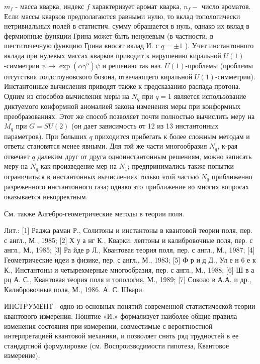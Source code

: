 \documentclass[10pt]{article}
\begin{document}
$m_{f}$ - масса кварка, индекс $f$ характеризует аромат кварка, $n_{f}-$ число ароматов. Если массы кварков предполагаются равными нулю, то вклад топологически нетривиальных полей в статистич. сумму обрашается в нуль, однако их вклад в фермионные функции Грина может быть ненулевым (в частности, в шеститочечную функцию Грина вносят вклад И. с $q= \pm 1$ ). Учет инстантонного вклада при нулевых массах кварков приводит к нарушению киральной $U(1)$-симметрии $\psi \rightarrow \exp \left(\alpha \gamma^{5}\right) \psi$ и решению так наз. $U(1)$-проблемы (проблемы отсутствия голдстоуновского бозона, отвечающего киральной $U(1)$-симметрии). Инстантонные вычисления приводят также к предсказанию распада протона. Одним из способов вычисления меры на $N_{q}$ при $q=1$ является использование диктуемого конформной аномалией закона изменения меры при конформных преобразованиях. Этот же способ позволяет почти полностью вычислить меру на $M_{q}$ при $G=S U(2)$ (он дает зависимость от 12 из 13 инстантонных параметров). При больших $q$ приходится прибегать к более сложным методам и ответы становятся менее явными. Для той же части многообразия $N_{q}$, к-рая отвечает $q$ далеким друг от друга одноинстантонным решениям, можно записать меру на $N_{q}$ как произведение мер на $N_{1}$; предпринимались также попытки ограничиться в инстантонных вычислениях только этой частью $N_{q}$ приближенно разреженного инстантонного газа; однако это приближение во многих вопросах оказывается некорректным.



См. также Алгебро-геометрические методы в теории поля.



Лит.: [1] Раджа раман Р., Солитоны и инстантоны в квантовой теории поля, пер. с англ., М., 1985; [2] Х у а нг К., Кварки, лептоны и калибровочные поля, пер. с англ., М., 1985; [3] Ра йде р Л., Квантовая теория поля, пер. с англ., М., 1987; [4] Геометрические идеи в физике, пер. с англ., М., 1983; [5] Ф р и д Д., Ул е н 6 е к К., Инстантоны и четырехмерные многообразия, пер. с англ., М., 1988; [6] Ш в а рц А. С., Квантовая теория поля и топология, М., 1989; [7] Соколо в А.А. и др., Калибровочные поля, М., 1986. А. С. Швари.



ИНСТPУМЕНТ - одно из основных понятий современной статистической теории квантового измерения. Понятие «И.» формализует наиболее общие правила изменения состояния при измерении, совместимые с вероятностной интерпретацией квантовой механики, и позволяет снять ряд трудностей в ее стандартной формулировке (см. Воспроизводимости гипотеза, Квантовое измерение).
\end{document}
